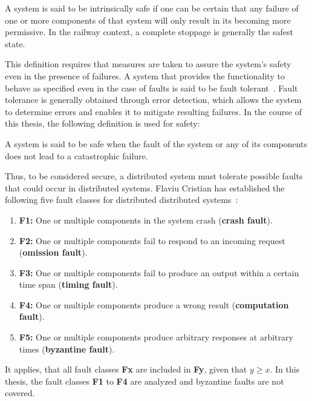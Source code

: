 \begin{definition}
A system is said to be intrinsically safe if one can be certain that any failure of one or more components of that system will only result in its becoming more permissive.
In the railway context, a complete stoppage is generally the safest state.
\label{def:intrinsic_safety}
\end{definition}

This definition requires that measures are taken to assure the system's safety even in the presence of failures.
A system that provides the functionality to behave as specified even in the case of faults is said to be fault tolerant~\cite{AvizienisDependability2001}.
Fault tolerance is generally obtained through error detection, which allows the system to determine errors and enables it to mitigate resulting failures.
In the course of this thesis, the following definition is used for safety:

\begin{definition}
A system is said to be safe when the fault of the system or any of its components does not lead to a catastrophic failure.
\label{def:safety}
\end{definition}

Thus, to be considered secure, a distributed system must tolerate possible faults that could occur in distributed systems.
Flaviu Cristian has established the following five fault classes for distributed distributed systems~\cite{CristianFaultModel}:

\begin{enumerate}
\item \textbf{F1:} One or multiple components in the system crash (\textbf{crash fault}).
\item \textbf{F2:} One or multiple components fail to respond to an incoming request (\textbf{omission fault}).
\item \textbf{F3:} One or multiple components fail to produce an output within a certain time span (\textbf{timing fault}).
\item \textbf{F4:} One or multiple components produce a wrong result (\textbf{computation fault}).
\item \textbf{F5:} One or multiple components produce arbitrary responses at arbitrary times (\textbf{byzantine fault}).
\end{enumerate}

It applies, that all fault classes \textbf{Fx} are included in \textbf{Fy}, given that $y \geq x$.
In this thesis, the fault classes \textbf{F1} to \textbf{F4} are analyzed and byzantine faults are not covered.
\\

